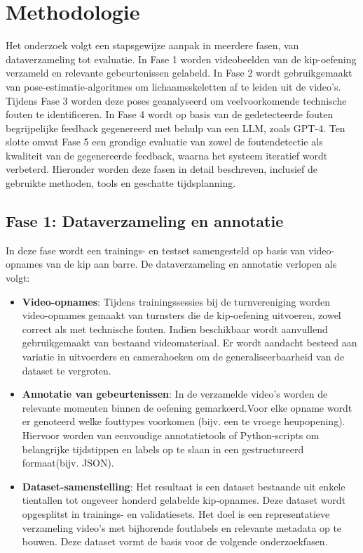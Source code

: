 \section{Methodologie}%
\label{sec:methodologie}

Het onderzoek volgt een stapsgewijze aanpak in meerdere fasen, van dataverzameling tot evaluatie. In Fase 1 worden videobeelden van de kip-oefening verzameld en relevante gebeurtenissen gelabeld. In Fase 2 wordt gebruikgemaakt van pose-estimatie-algoritmes om lichaamsskeletten af te leiden uit de video's. Tijdens Fase 3 worden deze poses geanalyseerd om veelvoorkomende technische fouten te identificeren. In Fase 4 wordt op basis van de gedetecteerde fouten begrijpelijke feedback gegenereerd met behulp van een LLM, zoals GPT-4. Ten slotte omvat Fase 5 een grondige evaluatie van zowel de foutendetectie als kwaliteit van de gegenereerde feedback, waarna het systeem iteratief wordt verbeterd. Hieronder worden deze fasen in detail beschreven, inclusief de gebruikte methoden, tools en geschatte tijdsplanning.

\subsection{Fase 1: Dataverzameling en annotatie}

In deze fase wordt een trainings- en testset samengesteld op basis van video-opnames van de kip aan barre. De dataverzameling en annotatie verlopen als volgt:

\begin{itemize}
    \item \textbf{Video-opnames}: Tijdens trainingssessies bij de turnvereniging worden video-opnames gemaakt van turnsters die de kip-oefening uitvoeren, zowel correct als met technische fouten. Indien beschikbaar wordt aanvullend gebruikgemaakt van bestaand videomateriaal. Er wordt aandacht besteed aan variatie in uitvoerders en camerahoeken om de generaliseerbaarheid van de dataset te vergroten.
    \item \textbf{Annotatie van gebeurtenissen}: In de verzamelde video's worden de relevante momenten binnen de oefening gemarkeerd.\newline Voor elke opname wordt er genoteerd welke fouttypes voorkomen (bijv. een te vroege heupopening). Hiervoor worden van eenvoudige annotatietools of Python-scripts om belangrijke tijdstippen en labels op te slaan in een gestructureerd formaat(bijv. JSON).
    \item \textbf{Dataset-samenstelling}: Het resultaat is een dataset bestaande uit enkele tientallen tot ongeveer honderd gelabelde kip-opnames. Deze dataset wordt opgesplitst in trainings- en validatiesets. Het doel is een representatieve verzameling video's met bijhorende foutlabels en relevante metadata op te bouwen. Deze dataset vormt de basis voor de volgende onderzoekfasen.
\end{itemize}

